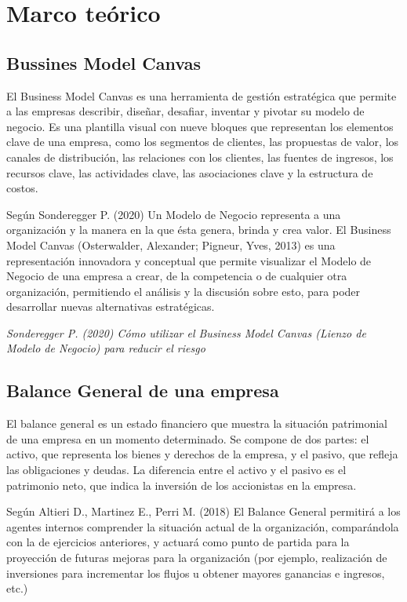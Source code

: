 \documentclass{article}
\newenvironment{marcoTeorico}{\section{Marco teórico}}{}
\begin{document}
\begin{marcoTeorico}
  \vspace{-0.5cm}
  \subsection{Bussines Model Canvas}

  El Business Model Canvas es una herramienta de gestión estratégica que permite a las empresas describir, diseñar, desafiar, inventar y pivotar su modelo de negocio. Es una plantilla visual con nueve bloques que representan los elementos clave de una empresa, como los segmentos de clientes, las propuestas de valor, los canales de distribución, las relaciones con los clientes, las fuentes de ingresos, los recursos clave, las actividades clave, las asociaciones clave y la estructura de costos.

  Según Sonderegger P. (2020) Un Modelo de Negocio representa a una organización y la manera en la que ésta genera, brinda y crea valor. El Business Model Canvas (Osterwalder, Alexander; Pigneur, Yves, 2013) es una representación innovadora y conceptual que permite visualizar el Modelo de Negocio de una empresa a crear, de la competencia o de cualquier otra organización, permitiendo el análisis y la discusión sobre esto, para poder desarrollar nuevas alternativas estratégicas. 

  \begin{flushright}
    \textit{Sonderegger P. (2020) Cómo utilizar el Business Model Canvas (Lienzo de Modelo de Negocio) para reducir el riesgo}
  \end{flushright}
  \vspace{-0.5cm}
  \subsection{Balance General de una empresa}

El balance general es un estado financiero que muestra la situación patrimonial de una empresa en un momento determinado. Se compone de dos partes: el activo, que representa los bienes y derechos de la empresa, y el pasivo, que refleja las obligaciones y deudas. La diferencia entre el activo y el pasivo es el patrimonio neto, que indica la inversión de los accionistas en la empresa.

Según Altieri D., Martinez E., Perri M. (2018) El Balance General permitirá a los agentes internos comprender la situación actual de la organización, comparándola con la de ejercicios anteriores, y actuará como punto de partida para la proyección de futuras mejoras para la organización (por ejemplo, realización de inversiones para incrementar los flujos u obtener mayores ganancias e ingresos, etc.)


\end{marcoTeorico}
\end{document}

